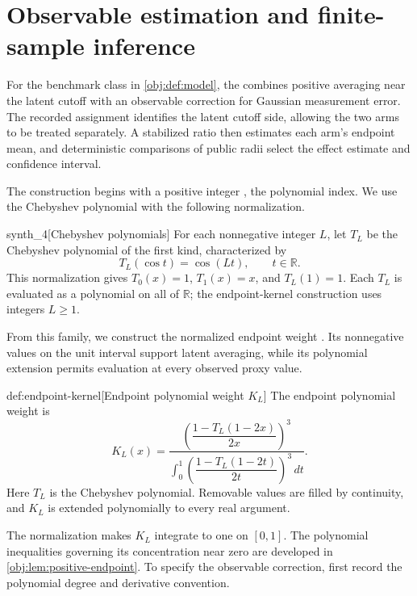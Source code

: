 \documentclass[11pt]{article}
\begin{document}
\section{Observable estimation and finite-sample inference}

For the benchmark class in \cref{obj:def:model}, the  combines positive averaging near the latent cutoff with an observable correction for Gaussian measurement error. The recorded assignment identifies the latent cutoff side, allowing the two arms to be treated separately. A stabilized ratio then estimates each arm's endpoint mean, and deterministic comparisons of public radii select the effect estimate and confidence interval.

The construction begins with a positive integer , the polynomial index. We use the Chebyshev polynomial  with the following normalization.

\begin{definitionv}{synth_4}[Chebyshev polynomials]
For each nonnegative integer \(L\), let \(T_L\) be the Chebyshev polynomial of the first kind, characterized by
\[
T_L(\cos t)=\cos(Lt),
\qquad t\in\mathbb R.
\]
This normalization gives \(T_0(x)=1\), \(T_1(x)=x\), and \(T_L(1)=1\). Each \(T_L\) is evaluated as a polynomial on all of \(\mathbb R\); the endpoint-kernel construction uses integers \(L\ge1\).
\end{definitionv}

From this family, we construct the normalized endpoint weight . Its nonnegative values on the unit interval support latent averaging, while its polynomial extension permits evaluation at every observed proxy value.

\begin{definitionv}{def:endpoint-kernel}[Endpoint polynomial weight $K_L$]
The endpoint polynomial weight is
\[
K_L(x)
=
\frac{
\left(\dfrac{1-T_L(1-2x)}{2x}\right)^3
}{
\displaystyle\int_0^1
\left(\dfrac{1-T_L(1-2t)}{2t}\right)^3\,dt
}.
\]
Here \(T_L\) is the Chebyshev polynomial. Removable values are filled by continuity, and \(K_L\) is extended polynomially to every real argument.
\end{definitionv}

The normalization makes \(K_L\) integrate to one on \([0,1]\). The polynomial inequalities governing its concentration near zero are developed in \cref{obj:lem:positive-endpoint}. To specify the observable correction, first record the polynomial degree  and derivative convention.
\end{document}
